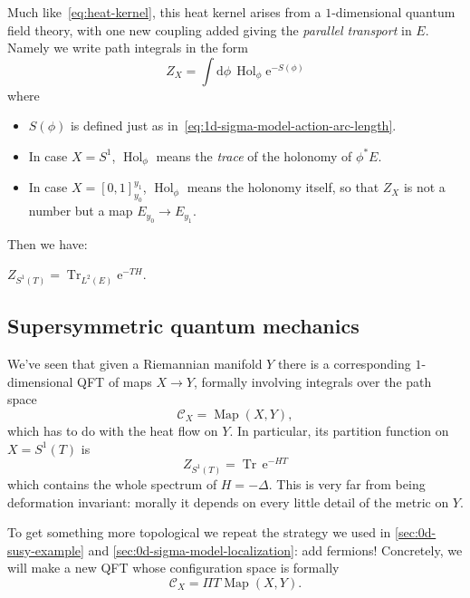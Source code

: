\documentclass[12pt,letterpaper,reqno]{article}
\numberwithin{equation}{section}
\newcommand{\cC}{\ensuremath{\mathcal C}}
\newcommand{\e}{{\mathrm e}}
\newcommand{\de}{\mathrm{d}}
\newcommand{\ti}[1]{\textit{#1}}
\DeclareMathOperator{\Tr}{Tr}
\DeclareMathOperator{\Hol}{Hol}
\DeclareMathOperator{\Map}{Map}
\begin{document}
Much like~\eqref{eq:heat-kernel},
this heat kernel arises from a $1$-dimensional quantum field theory,
with one new coupling added giving the \ti{parallel transport} in $E$.
Namely we write path integrals in the form
\begin{equation}
 Z_X =  \int \de \phi \, \Hol_{\phi} \e^{-S(\phi)}
\end{equation}
where 
\begin{itemize}
\item $S(\phi)$ is defined just as in~\eqref{eq:1d-sigma-model-action-arc-length}.
\item
In case $X = S^1$, $\Hol_\phi$ means the \ti{trace} of the holonomy
of $\phi^* E$. 
\item In case $X = [0,1]_{y_0}^{y_1}$, $\Hol_\phi$ means the
holonomy itself, so that $Z_X$ is not a number but a map
$E_{y_0} \to E_{y_1}$.
\end{itemize}
Then we have:
\begin{prop} \label{prop:trace-coupled}
$Z_{S^1(T)} = \Tr_{L^2(E)} \e^{-T H}$.
\end{prop}


\subsection{Supersymmetric quantum mechanics}

We've seen that given a Riemannian manifold $Y$ there is a corresponding
$1$-dimensional QFT of maps $X \to Y$, formally involving integrals
over the path space
\begin{equation}
  \cC_X = \Map(X,Y),
\end{equation}
which has to do with the heat flow on $Y$.
In particular, its partition function on $X = S^1(T)$ is
\begin{equation}
  Z_{S^1(T)} = \Tr \, \e^{-H T}
\end{equation}
which contains the whole spectrum of $H = -\Delta$. This is very far
from being deformation invariant: morally it depends on every little
detail of the metric on $Y$.

To get something more topological we repeat the strategy we used
in \autoref{sec:0d-susy-example} and \autoref{sec:0d-sigma-model-localization}: add fermions!
Concretely, we will make a new QFT whose configuration space is formally
\begin{equation}
  \cC_X = \Pi T \Map(X,Y).
\end{equation}
\end{document}

